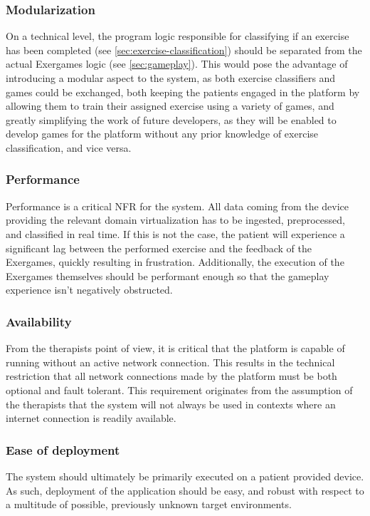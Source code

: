 \subsubsection{Modularization}
\label{sec:nfr:modularization}
On a technical level, the program logic responsible for classifying if an exercise has been completed (see \ref{sec:exercise-classification}) should be separated from the actual Exergames logic (see \ref{sec:gameplay}). This would pose the advantage of introducing a modular aspect to the system, as both exercise classifiers and games could be exchanged, both keeping the patients engaged in the platform by allowing them to train their assigned exercise using a variety of games, and greatly simplifying the work of future developers, as they will be enabled to develop games for the platform without any prior knowledge of exercise classification, and vice versa.

\subsubsection{Performance}
\label{sec:nfr:performance}
Performance is a critical \gls{NFR} for the system. All data coming from the device providing the relevant domain virtualization has to be ingested, preprocessed, and classified in real time. If this is not the case, the patient will experience a significant lag between the performed exercise and the feedback of the Exergames, quickly resulting in frustration. Additionally, the execution of the Exergames themselves should be performant enough so that the gameplay experience isn't negatively obstructed. 

\subsubsection{Availability}
\label{sec:nfr:availability}
From the therapists point of view, it is critical that the platform is capable of running without an active network connection. This results in the technical restriction that all network connections made by the platform must be both optional and fault tolerant. This requirement originates from the assumption of the therapists that the system will not always be used in contexts where an internet connection is readily available.


\subsubsection{Ease of deployment}
\label{sec:nfr:deployment}
The system should ultimately be primarily executed on a patient provided device. As such, deployment of the application should be easy, and robust with respect to a multitude of possible, previously unknown target environments.

